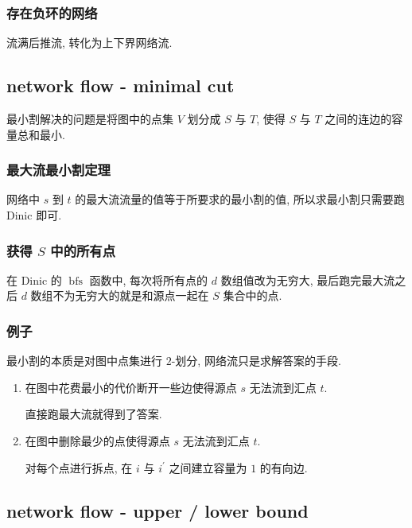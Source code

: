 \documentclass[UTF8, a4paper, titlepage, twoside]{ctexart}
\begin{document}
\subsubsection*{ 存在负环的网络 }
流满后推流, 转化为上下界网络流.

\subsection{ network flow - minimal cut }
最小割解决的问题是将图中的点集 \(V\) 划分成 \(S\) 与 \(T\), 使得 \(S\) 与 \(T\) 之间的连边的容量总和最小.

\subsubsection*{ 最大流最小割定理 }
网络中 \(s\) 到 \(t\) 的最大流流量的值等于所要求的最小割的值, 所以求最小割只需要跑 Dinic 即可.

\subsubsection*{ 获得 \(S\) 中的所有点 }
在 Dinic 的 \(\operatorname{bfs}\) 函数中, 每次将所有点的 \(d\) 数组值改为无穷大, 最后跑完最大流之后 \(d\) 数组不为无穷大的就是和源点一起在 \(S\) 集合中的点.

\subsubsection*{ 例子 }
最小割的本质是对图中点集进行 \(2\)-划分, 网络流只是求解答案的手段.
\begin{enumerate}
    \item 在图中花费最小的代价断开一些边使得源点 \(s\) 无法流到汇点 \(t\).

          直接跑最大流就得到了答案.
    \item 在图中删除最少的点使得源点 \(s\) 无法流到汇点 \(t\).

          对每个点进行拆点, 在 \(i\) 与 \(i^\prime\) 之间建立容量为 \(1\) 的有向边.
\end{enumerate}

\subsection{ network flow - upper / lower bound }
\end{document}
